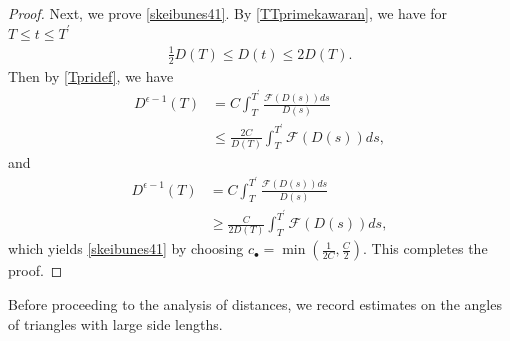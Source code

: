 \documentclass[reqno]{amsart}
\theoremstyle{plain}
\newtheorem{lemma}[theorem]{Lemma}
\theoremstyle{definition}
\numberwithin{equation}{section}
\newcommand{\1}{\mathbbm{1}}
\begin{document}
\begin{proof}
Next, we prove \eqref{skeibunes41}. By \eqref{TTprimekawaran}, we have for $T\leq t\leq T^{\prime}$
\begin{align*}
\frac{1}{2}D(T)\leq D(t)\leq 2D(T).
\end{align*}
Then by \eqref{Tpridef}, we have
\begin{align*}
D^{\epsilon-1}(T)&=C\int_T^{T^{\prime}} \frac{\mathcal{F}(D(s))ds}{D(s)}
\\
&\leq \frac{2C}{D(T)}\int_T^{T^{\prime}}\mathcal{F}(D(s))ds,
\end{align*}
and
\begin{align*}
D^{\epsilon-1}(T)&=C\int_T^{T^{\prime}} \frac{\mathcal{F}(D(s))ds}{D(s)}
\\
&\geq \frac{C}{2D(T)}\int_T^{T^{\prime}}\mathcal{F}(D(s))ds,
\end{align*}
which yields \eqref{skeibunes41} by choosing $c_{\bullet}=\min{(\frac{1}{2C},\frac{C}{2})}$. This completes the proof.
\end{proof}
Before proceeding to the analysis of distances, we record estimates on the angles of triangles with large side lengths.
\end{document}
